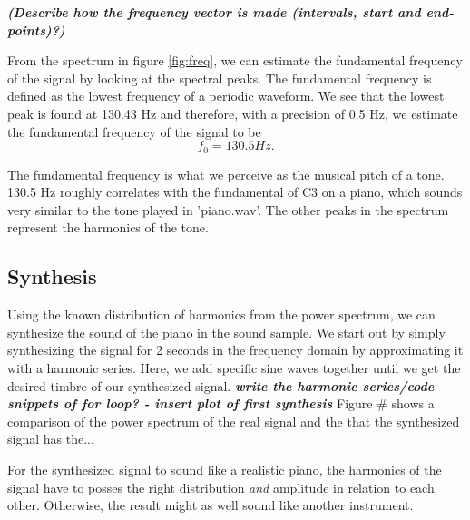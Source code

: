 \documentclass[journal]{IEEEtran}
\begin{document}
\textbf{\textit{(Describe how the frequency vector is made (intervals, start and end-points)?)}}

\newline
From the spectrum in figure \ref{fig:freq}, we can estimate the fundamental frequency of the signal by looking at the spectral peaks. The fundamental frequency is defined as the lowest frequency of a periodic waveform. %
We see that the lowest peak is found at 130.43 Hz and therefore, with a precision of 0.5 Hz, we estimate the fundamental frequency of the signal to be
\begin{equation}
    f_0 = 130.5 Hz.
\end{equation}

The fundamental frequency is what we perceive as the musical pitch of a tone. 130.5 Hz roughly correlates with the fundamental of C3 on a piano, which sounds very similar to the tone played in 'piano.wav'. The other peaks in the spectrum represent the harmonics of the tone. 

\subsection{Synthesis}
Using the known distribution of harmonics from the power spectrum, we can synthesize the sound of the piano in the sound sample. We start out by simply synthesizing the signal for 2 seconds in the frequency domain by approximating it with a harmonic series. Here, we add specific sine waves together until we get the desired timbre of our synthesized signal. 
\newline
\textbf{\textit{write the harmonic series/code snippets of for loop? - insert plot of first synthesis}}
\newline
Figure # shows a comparison of the power spectrum of the real signal and the  that the synthesized signal has the...

For the synthesized signal to sound like a realistic piano, the harmonics of the signal have to posses the right distribution \textit{and} amplitude in relation to each other. Otherwise, the result might as well sound like another instrument. 



\end{document}
